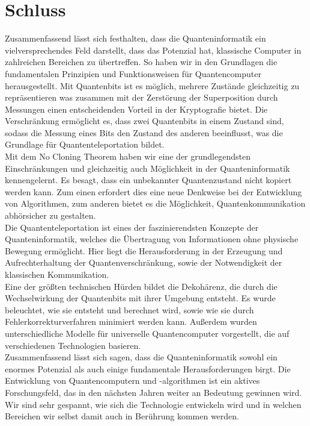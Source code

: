 \section{Schluss}
\label{sec:schluss}

Zusammenfassend lässt sich festhalten, dass die Quanteninformatik ein vielversprechendes Feld darstellt, dass das Potenzial hat, klassische Computer in zahlreichen Bereichen zu übertreffen.
So haben wir in den Grundlagen die fundamentalen Prinzipien und Funktionsweisen für Quantencomputer herausgestellt.
Mit Quantenbits ist es möglich, mehrere Zustände gleichzeitig zu repräsentieren was zusammen mit der Zerstörung der Superposition durch Messungen einen entscheidenden Vorteil in der Kryptografie bietet.
Die Verschränkung ermöglicht es, dass zwei Quantenbits in einem Zustand sind, sodass die Messung eines Bits den Zustand des anderen beeinflusst, was die Grundlage für Quantenteleportation bildet.\\

Mit dem No Cloning Theorem haben wir eine der grundlegendsten Einschränkungen und gleichzeitig auch Möglichkeit in der Quanteninformatik kennengelernt.
Es besagt, dass ein unbekannter Quantenzustand nicht kopiert werden kann.
Zum einen erfordert dies eine neue Denkweise bei der Entwicklung von Algorithmen, zum anderen bietet es die Möglichkeit, Quantenkommunikation abhörsicher zu gestalten.\\

Die Quantenteleportation ist eines der faszinierendsten Konzepte der Quanteninformatik, welches die Übertragung von Informationen ohne physische Bewegung ermöglicht.
Hier liegt die Herausforderung in der Erzeugung und Aufrechterhaltung der Quantenverschränkung, sowie der Notwendigkeit der klassischen Kommunikation.\\

Eine der größten technischen Hürden bildet die Dekohärenz, die durch die Wechselwirkung der Quantenbits mit ihrer Umgebung entsteht.
Es wurde beleuchtet, wie sie entsteht und berechnet wird, sowie wie sie durch Fehlerkorrekturverfahren minimiert werden kann.
Außerdem wurden unterschiedliche Modelle für universelle Quantencomputer vorgestellt, die auf verschiedenen Technologien basieren.\\

Zusammenfassend lässt sich sagen, dass die Quanteninformatik sowohl ein enormes Potenzial als auch einige fundamentale Herausforderungen birgt.
Die Entwicklung von Quantencomputern und -algorithmen ist ein aktives Forschungsfeld, das in den nächsten Jahren weiter an Bedeutung gewinnen wird.
Wir sind sehr gespannt, wie sich die Technologie entwickeln wird und in welchen Bereichen wir selbst damit auch in Berührung kommen werden.









